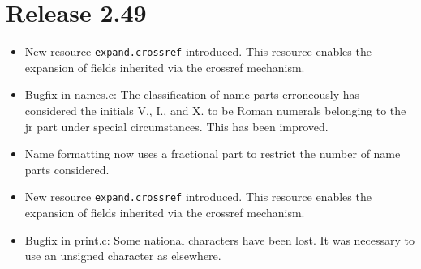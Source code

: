\documentclass[11pt,a4paper]{scrartcl}
\newcommand\rsc[1]{\texttt{#1}}
\newcommand\File[1]{\textsf{#1}}
\newenvironment{Release}[2]{\section*{Release #1}\begin{itemize}}{\end{itemize}}
\newenvironment{Fix}[1]{\item }{}
\newenvironment{New}[1]{\item }{}
\begin{document}
 \begin{Release}{2.49}{February 8, 2007}
  \begin{New}{gene}
    New resource \rsc{expand.crossref} introduced. This resource
    enables the expansion of fields inherited via the crossref mechanism.
  \end{New}
  \begin{Fix}{gene}
    Bugfix in \File{names.c}: The classification of name parts erroneously has
    considered the initials V., I., and X. to be Roman numerals belonging to
    the jr part under special circumstances. This has been improved.
  \end{Fix}

  \begin{New}{gene}
    Name formatting now uses a fractional part to restrict the number of name
    parts considered.
  \end{New}

  \begin{New}{gene}
    New resource \rsc{expand.crossref} introduced. This resource
    enables the expansion of fields inherited via the crossref mechanism.
  \end{New}
  \begin{Fix}{gene}
    Bugfix in \File{print.c}: Some national characters have been lost. It was
    necessary to use an unsigned character as elsewhere.
  \end{Fix}
 \end{Release}
\end{document}
